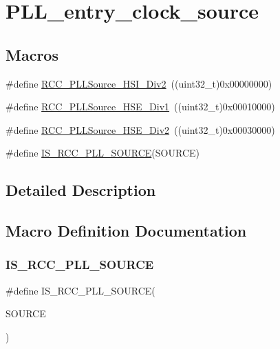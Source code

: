 \hypertarget{group___p_l_l__entry__clock__source}{}\section{P\+L\+L\+\_\+entry\+\_\+clock\+\_\+source}
\label{group___p_l_l__entry__clock__source}
\subsection*{Macros}
\begin{DoxyCompactItemize}
\item 
\#define \mbox{\hyperlink{group___p_l_l__entry__clock__source_ga53194dd3e2986980b156a3e8e456df06}{R\+C\+C\+\_\+\+P\+L\+L\+Source\+\_\+\+H\+S\+I\+\_\+\+Div2}}~((uint32\+\_\+t)0x00000000)
\item 
\#define \mbox{\hyperlink{group___p_l_l__entry__clock__source_ga62f02bf60a89bdef0d3a8137da3f4c2d}{R\+C\+C\+\_\+\+P\+L\+L\+Source\+\_\+\+H\+S\+E\+\_\+\+Div1}}~((uint32\+\_\+t)0x00010000)
\item 
\#define \mbox{\hyperlink{group___p_l_l__entry__clock__source_ga24863bc670737a2f5abce546a49e620c}{R\+C\+C\+\_\+\+P\+L\+L\+Source\+\_\+\+H\+S\+E\+\_\+\+Div2}}~((uint32\+\_\+t)0x00030000)
\item 
\#define \mbox{\hyperlink{group___p_l_l__entry__clock__source_ga8a8a84a16989bb4e5aca1af65ccf9a1b}{I\+S\+\_\+\+R\+C\+C\+\_\+\+P\+L\+L\+\_\+\+S\+O\+U\+R\+CE}}(S\+O\+U\+R\+CE)
\end{DoxyCompactItemize}


\subsection{Detailed Description}


\subsection{Macro Definition Documentation}
\mbox{\label{group___p_l_l__entry__clock__source_ga8a8a84a16989bb4e5aca1af65ccf9a1b}} 
\subsubsection{\texorpdfstring{IS\_RCC\_PLL\_SOURCE}{IS\_RCC\_PLL\_SOURCE}}
{\footnotesize\ttfamily \#define I\+S\+\_\+\+R\+C\+C\+\_\+\+P\+L\+L\+\_\+\+S\+O\+U\+R\+CE(\begin{DoxyParamCaption}\item[{}]{S\+O\+U\+R\+CE }\end{DoxyParamCaption})}

